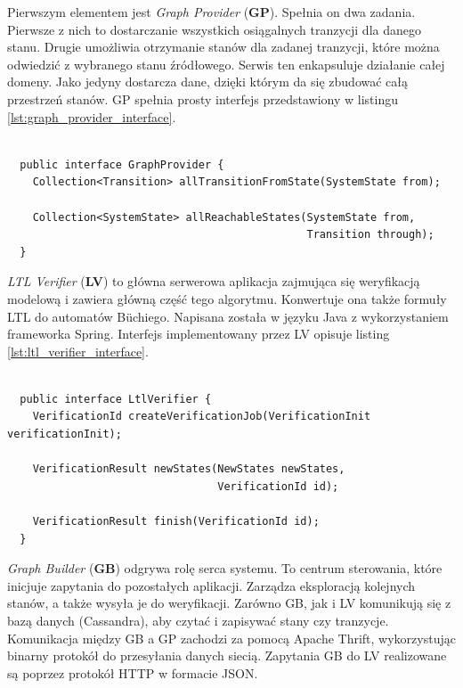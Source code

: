 Pierwszym elementem jest \textit{Graph Provider} (\textbf{GP}).
Spełnia on dwa zadania.
Pierwsze z nich to dostarczanie wszystkich osiągalnych tranzycji dla danego stanu.
Drugie umożliwia otrzymanie stanów dla zadanej tranzycji, które można odwiedzić z wybranego stanu źródłowego.
Serwis ten enkapsuluje działanie całej domeny.
Jako jedyny dostarcza dane, dzięki którym da się zbudować całą przestrzeń stanów.
GP spełnia prosty interfejs przedstawiony w listingu \ref{lst:graph_provider_interface}.

\begin{minipage}{\linewidth}
\begin{lstlisting}[caption={Interfejs implementowany przez GP.},captionpos=b,label={lst:graph_provider_interface}]

  public interface GraphProvider {
    Collection<Transition> allTransitionFromState(SystemState from);

    Collection<SystemState> allReachableStates(SystemState from,
                                               Transition through);
  }
\end{lstlisting}
\end{minipage}

\textit{LTL Verifier} (\textbf{LV}) to główna serwerowa aplikacja zajmująca się weryfikacją modelową i zawiera główną część tego algorytmu.
Konwertuje ona także formuły LTL do automatów Büchiego.
Napisana została w języku Java z wykorzystaniem frameworka Spring.
Interfejs implementowany przez LV opisuje listing \ref{lst:ltl_verifier_interface}.

\begin{lstlisting}[caption={Interfejs implementowany przez LV.},captionpos=b,label={lst:ltl_verifier_interface}]

  public interface LtlVerifier {
    VerificationId createVerificationJob(VerificationInit verificationInit);

    VerificationResult newStates(NewStates newStates,
                                 VerificationId id);

    VerificationResult finish(VerificationId id);
  }
\end{lstlisting}

\textit{Graph Builder} (\textbf{GB}) odgrywa rolę serca systemu.
To centrum sterowania, które inicjuje zapytania do pozostałych aplikacji.
Zarządza eksploracją kolejnych stanów, a także wysyła je do weryfikacji.
Zarówno GB, jak i LV komunikują się z bazą danych (Cassandra), aby czytać i zapisywać stany czy tranzycje.
Komunikacja między GB a GP zachodzi za pomocą Apache Thrift, wykorzystując binarny protokół do  przesyłania danych siecią.
Zapytania GB do LV realizowane są poprzez protokół HTTP w formacie JSON.
